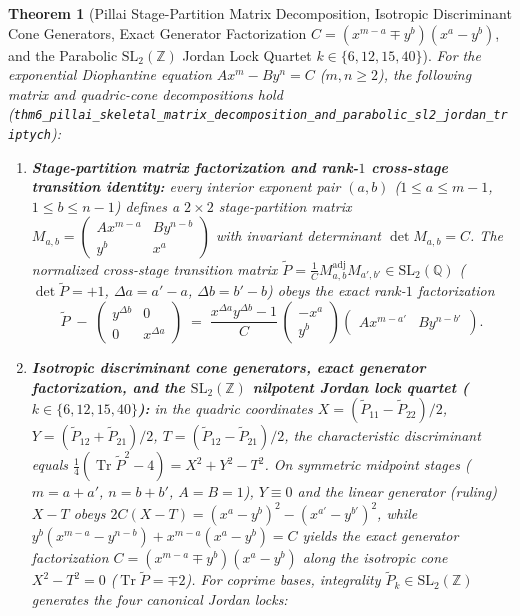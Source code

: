 \documentclass[11pt,a4paper]{article}
\theoremstyle{plain}
\newtheorem{theorem}{Theorem}[section]
\theoremstyle{definition}
\begin{document}
\begin{theorem}[Pillai Stage-Partition Matrix Decomposition, Isotropic Discriminant Cone Generators, Exact Generator Factorization $C = (x^{m-a}\mp y^b)(x^a-y^b)$, and the Parabolic $\mathrm{SL}_2(\mathbb{Z})$ Jordan Lock Quartet $k\in\{6,12,15,40\}$]
\label{thm:main-6}
For the exponential Diophantine equation $A x^m - B y^n = C$ ($m,n\ge 2$), the following matrix and quadric-cone decompositions hold (\texttt{thm6\_pillai\_skeletal\_matrix\_decomposition\_and\_parabolic\_sl2\_jordan\_triptych}):
\begin{enumerate}[label=\textbf{(\roman*)},leftmargin=*]
\item \textbf{Stage-partition matrix factorization and rank-$1$ cross-stage transition identity:}
  every interior exponent pair $(a,b)$ ($1\le a\le m-1$, $1\le b\le n-1$) defines a $2\times 2$ stage-partition matrix $M_{a,b} = \begin{pmatrix} A x^{m-a} & B y^{n-b} \\ y^b & x^a \end{pmatrix}$ with invariant determinant $\det M_{a,b} = C$. The normalized cross-stage transition matrix $\widetilde{P} = \frac{1}{C} M_{a,b}^{\mathrm{adj}} M_{a',b'}\in\mathrm{SL}_2(\mathbb{Q})$ ($\det\widetilde{P} = +1$, $\Delta a = a'-a$, $\Delta b = b'-b$) obeys the exact rank-$1$ factorization
  \[
    \widetilde{P} \;-\; \begin{pmatrix} y^{\Delta b} & 0 \\ 0 & x^{\Delta a} \end{pmatrix}
    \;=\; \frac{x^{\Delta a}y^{\Delta b}-1}{C}\,\begin{pmatrix} -x^a \\ y^b \end{pmatrix}\begin{pmatrix} A x^{m-a'} & B y^{n-b'} \end{pmatrix}.
  \]
\item \textbf{Isotropic discriminant cone generators, exact generator factorization, and the $\mathrm{SL}_2(\mathbb{Z})$ nilpotent Jordan lock quartet ($k\in\{6,12,15,40\}$):}
  in the quadric coordinates $X = (\widetilde{P}_{11}-\widetilde{P}_{22})/2$, $Y = (\widetilde{P}_{12}+\widetilde{P}_{21})/2$, $T = (\widetilde{P}_{12}-\widetilde{P}_{21})/2$, the characteristic discriminant equals $\frac{1}{4}(\operatorname{Tr}\widetilde{P}^2 - 4) = X^2 + Y^2 - T^2$. On symmetric midpoint stages ($m=a+a'$, $n=b+b'$, $A=B=1$), $Y\equiv 0$ and the linear generator (ruling) $X - T$ obeys $2C(X - T) = (x^a - y^b)^2 - (x^{a'} - y^{b'})^2$, while $y^b(x^{m-a}-y^{n-b}) + x^{m-a}(x^a-y^b) = C$ yields the exact generator factorization $C = (x^{m-a}\mp y^b)(x^a - y^b)$ along the isotropic cone $X^2 - T^2 = 0$ ($\operatorname{Tr}\widetilde{P} = \mp 2$). For coprime bases, integrality $\widetilde{P}_k\in\mathrm{SL}_2(\mathbb{Z})$ generates the four canonical Jordan locks:

\end{enumerate}
\end{theorem}
\end{document}
